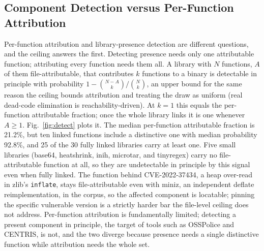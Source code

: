 \documentclass[conference]{IEEEtran}
\begin{document}
\subsection{Component Detection versus Per-Function Attribution}
Per-function attribution and library-presence detection are different questions, and
the ceiling answers the first. Detecting presence needs only one attributable function;
attributing every function needs them all. A library with $N$
functions, $A$ of them file-attributable, that contributes $k$ functions to a binary
is detectable in principle with probability $1-\binom{N-A}{k}/\binom{N}{k}$, an
upper bound for the same reason the ceiling bounds attribution and treating the draw as
uniform (real dead-code elimination is reachability-driven). At $k=1$ this equals the
per-function attributable fraction; once the whole library links it is one whenever
$A\geq1$. Fig.~\ref{fig:detect} plots it. The median per-function attributable fraction
is 21.2\%, but ten linked functions include a distinctive one with median probability
92.8\%, and 25 of the 30 fully linked libraries carry at least one. Five small libraries
(base64, heatshrink, inih, microtar, and tinyregex) carry no file-attributable function
at all, so they are undetectable in principle by this signal even when fully linked. The
function behind CVE-2022-37434, a heap over-read in zlib's \texttt{inflate}, stays
file-attributable even with miniz, an independent deflate reimplementation, in the
corpus, so the affected component is locatable; pinning the specific vulnerable version
is a strictly harder bar the file-level ceiling does not address. Per-function
attribution is fundamentally limited; detecting a present component in principle, the
target of tools such as OSSPolice and CENTRIS, is not, and the two diverge because
presence needs a single distinctive function while attribution needs the whole set.
\end{document}
